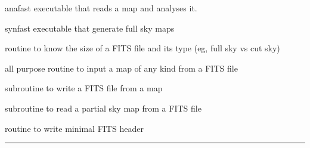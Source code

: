 \begin{related}
  \begin{sulist}{} %
  \item[anafast] executable that reads a \healpix map and analyses it. 
  \item[synfast] executable that generate full sky \healpix maps
  \item[\htmlref{getsize\_fits}{sub:getsize_fits}] routine to know the size of a FITS file and its type (eg, full sky vs cut sky)
  \item[\htmlref{input\_map}{sub:input_map}] all purpose routine to input a map of any kind from a FITS file
  \item[\htmlref{output\_map}{sub:output_map}] subroutine to write a FITS file from a \healpix map
  \item[\htmlref{read\_fits\_partial}{sub:read_fits_partial}] subroutine to read a \healpix partial sky map from a FITS file
  \item[\htmlref{write\_minimal\_header}{sub:write_minimal_header}] routine to write minimal FITS header
  \end{sulist}
\end{related}

\rule{\hsize}{2mm}

\newpage
